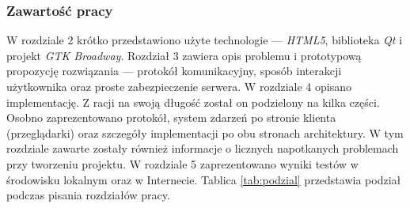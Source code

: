 \subsubsection{Zawartość pracy}

W rozdziale 2 krótko przedstawiono użyte technologie --- \emph{HTML5}, biblioteka \emph{Qt} i projekt \emph{GTK Broadway}. Rozdział 3 zawiera opis problemu i prototypową propozycję rozwiązania --- protokół komunikacyjny, sposób interakcji użytkownika oraz proste zabezpieczenie serwera. W rozdziale 4 opisano implementację. Z racji na swoją długość został on podzielony na kilka części. Osobno zaprezentowano protokół, system zdarzeń po stronie klienta (przeglądarki) oraz szczegóły implementacji po obu stronach architektury. W tym rozdziale zawarte zostały również informacje o licznych napotkanych problemach przy tworzeniu projektu. W rozdziale 5 zaprezentowano wyniki testów w środowisku lokalnym oraz w Internecie.
Tablica \ref{tab:podzial} przedstawia podział podczas pisania rozdziałów pracy.

